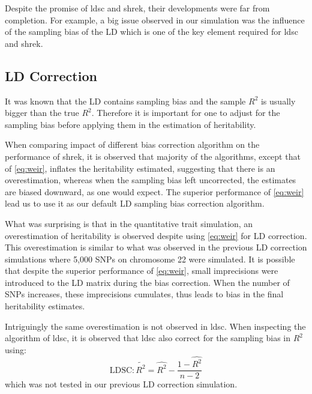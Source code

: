 	Despite the promise of \gls{ldsc} and \gls{shrek}, their developments were far from completion.
	For example, a big issue observed in our simulation was the influence of the sampling bias of the \gls{LD} which is one of the key element required for \gls{ldsc} and \gls{shrek}.
	
	\subsection{LD Correction}
	It was known that the \gls{LD} contains sampling bias and the sample $R^2$ is usually bigger than the true $R^2$.
	Therefore it is important for one to adjust for the sampling bias before applying them in the estimation of heritability.
	
	When comparing impact of different bias correction algorithm on the performance of \gls{shrek}, it is observed that majority of the algorithms, except that of \cref{eq:weir}, inflates the heritability estimated, suggesting that there is an overestimation, whereas when the sampling bias left uncorrected, the estimates are biased downward, as one would expect.
	The superior performance of \cref{eq:weir} lead us to use it as our default \gls{LD} sampling bias correction algorithm.
	
	What was surprising is that in the quantitative trait simulation, an overestimation of heritability is observed despite using \cref{eq:weir} for \gls{LD} correction.
	This overestimation is similar to what was observed in the previous \gls{LD} correction simulations where 5,000 \glspl{SNP} on chromosome 22 were simulated.
	It is possible that despite the superior performance of \cref{eq:weir}, small imprecisions were introduced to the \gls{LD} matrix during the bias correction.
	When the number of \glspl{SNP} increases, these imprecisions cumulates, thus leads to bias in the final heritability estimates.
	
	Intriguingly the same overestimation is not observed in \gls{ldsc}.
	When inspecting the algorithm of \gls{ldsc}, it is observed that \gls{ldsc} also correct for the sampling bias in $R^2$ using:
	\begin{equation}
	\text{LDSC}: \tilde{R^2}= \hat{R^2}-\frac{1-\hat{R^2}}{n-2}\label{eq:ldscR2} 
	\end{equation}
	which was not tested in our previous \gls{LD} correction simulation.
	
